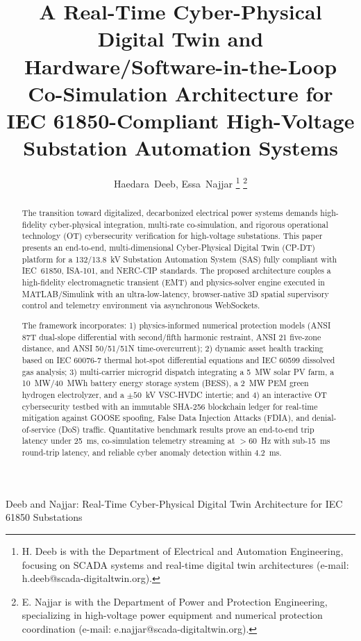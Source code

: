 \documentclass[journal]{IEEEtran}
\begin{document}
\title{A Real-Time Cyber-Physical Digital Twin and Hardware/Software-in-the-Loop Co-Simulation Architecture for IEC 61850-Compliant High-Voltage Substation Automation Systems}

\author{Haedara~Deeb,
        Essa~Najjar
\thanks{H. Deeb is with the Department of Electrical and Automation Engineering, focusing on SCADA systems and real-time digital twin architectures (e-mail: h.deeb@scada-digitaltwin.org).}
\thanks{E. Najjar is with the Department of Power and Protection Engineering, specializing in high-voltage power equipment and numerical protection coordination (e-mail: e.najjar@scada-digitaltwin.org).}
}

%
{Deeb and Najjar: Real-Time Cyber-Physical Digital Twin Architecture for IEC 61850 Substations}

\maketitle

\begin{abstract}
The transition toward digitalized, decarbonized electrical power systems demands high-fidelity cyber-physical integration, multi-rate co-simulation, and rigorous operational technology (OT) cybersecurity verification for high-voltage substations. This paper presents an end-to-end, multi-dimensional Cyber-Physical Digital Twin (CP-DT) platform for a 132/13.8~kV Substation Automation System (SAS) fully compliant with IEC~61850, ISA-101, and NERC-CIP standards. The proposed architecture couples a high-fidelity electromagnetic transient (EMT) and physics-solver engine executed in MATLAB/Simulink with an ultra-low-latency, browser-native 3D spatial supervisory control and telemetry environment via asynchronous WebSockets. 

The framework incorporates: 1) physics-informed numerical protection models (ANSI 87T dual-slope differential with second/fifth harmonic restraint, ANSI 21 five-zone distance, and ANSI 50/51/51N time-overcurrent); 2) dynamic asset health tracking based on IEC 60076-7 thermal hot-spot differential equations and IEC 60599 dissolved gas analysis; 3) multi-carrier microgrid dispatch integrating a 5~MW solar PV farm, a 10~MW/40~MWh battery energy storage system (BESS), a 2~MW PEM green hydrogen electrolyzer, and a $\pm 50$~kV VSC-HVDC intertie; and 4) an interactive OT cybersecurity testbed with an immutable SHA-256 blockchain ledger for real-time mitigation against GOOSE spoofing, False Data Injection Attacks (FDIA), and denial-of-service (DoS) traffic. Quantitative benchmark results prove an end-to-end trip latency under 25~ms, co-simulation telemetry streaming at $>60$~Hz with sub-15~ms round-trip latency, and reliable cyber anomaly detection within 4.2~ms.
\end{abstract}
\end{document}

